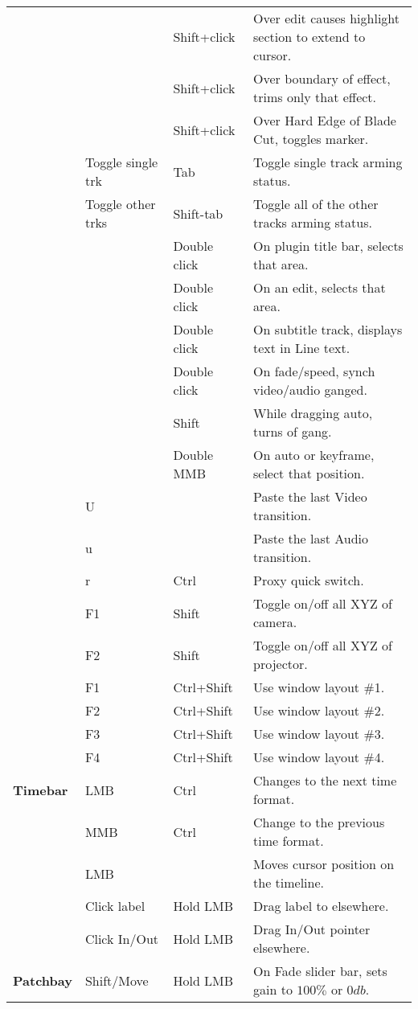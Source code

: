 \begin{longtable}[h]{>{\bfseries}p{}p{}p{}p{}}
  &  & Shift+click & Over edit causes highlight section to extend to cursor. \\
  &  & Shift+click & Over boundary of effect, trims only that effect. \\
  &  & Shift+click & Over Hard Edge of Blade Cut, toggles marker. \\
  & Toggle single trk & Tab & Toggle single track arming status. \\
  & Toggle other trks & Shift-tab & Toggle all of the other tracks arming status. \\
  &  & Double click & On plugin title bar, selects that area. \\
  &  & Double click & On an edit, selects that area. \\
  &  & Double click & On subtitle track, displays text in Line text. \\
  &  & Double click & On fade/speed, synch video/audio ganged. \\
  &  & Shift & While dragging auto, turns of gang. \\
  &  & Double MMB & On auto or keyframe, select that position. \\
  & U &  & Paste the last Video transition. \\
  & u &  & Paste the last Audio transition. \\
  & r & Ctrl & Proxy quick switch. \\
  & F1 & Shift & Toggle on/off all XYZ of camera. \\
  & F2 & Shift & Toggle on/off all XYZ of projector. \\
  & F1 & Ctrl+Shift & Use window layout \#1. \\
  & F2 & Ctrl+Shift & Use window layout \#2. \\
  & F3 & Ctrl+Shift & Use window layout \#3. \\
  & F4 & Ctrl+Shift & Use window layout \#4. \\
  \midrule
  \textcolor{CinBlueText}{Timebar} & LMB & Ctrl & Changes to the next time format. \\
  & MMB & Ctrl & Change to the previous time format. \\
  & LMB &  & Moves cursor position on the timeline. \\
  & Click label & Hold LMB & Drag label to elsewhere. \\
  & Click In/Out & Hold LMB & Drag In/Out pointer elsewhere. \\
  \midrule
  \textcolor{CinBlueText}{Patchbay} & Shift/Move & Hold LMB & On Fade slider bar, sets gain to $100\%$ or $0db$. \\
  \bottomrule
\end{longtable}


